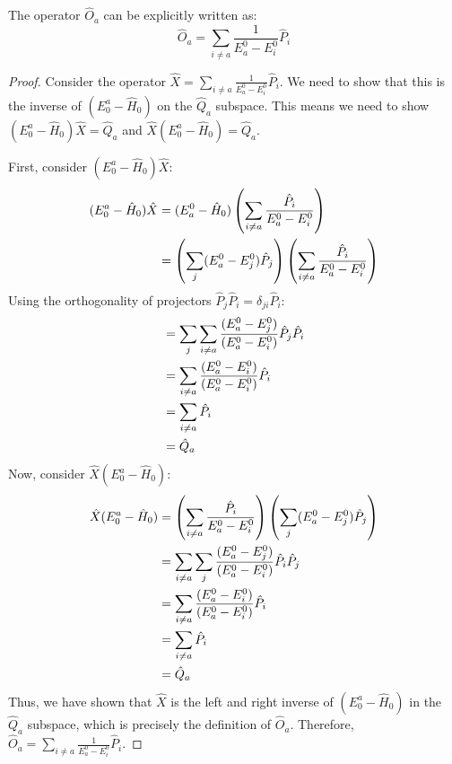 \begin{lemma}
    The operator $\hat O_a$ can be explicitly written as:
    \begin{equation} \label{eq:kato_operator_O_a_sum_form}
        \hat O_a = \sum_{i \ne a}\frac{1}{E_a^0 - E_i^0} \hat P_i
    \end{equation}
\end{lemma}
\begin{proof}
    Consider the operator $\hat X = \sum_{i \ne a}\frac{1}{E_a^0 -
    E_i^0} \hat P_i$. We need to show that this is the inverse of
    $(E^a_0 - \hat H_0)$ on the $\hat Q_a$ subspace. This means we
    need to show $(E^a_0 - \hat H_0) \hat X = \hat Q_a$ and $\hat X
    (E^a_0 - \hat H_0) = \hat Q_a$.

    First, consider $(E^a_0 - \hat H_0) \hat X$:
    \begin{align} \label{eq:O_a_inverse_proof1}
        (E^a_0 - \hat H_0) \hat X &= (E_a^0 - \hat H_0) \left(
        \sum_{i \ne a} \frac{\hat P_i}{E_a^0 - E_i^0} \right) \\
        &= \left( \sum_{j} (E_a^0 - E_j^0) \hat P_j \right) \left(
        \sum_{i \ne a} \frac{\hat P_i}{E_a^0 - E_i^0} \right) \notag
    \end{align}
    Using the orthogonality of projectors $\hat P_j \hat P_i =
    \delta_{ji} \hat P_i$:
    \begin{align}
        &= \sum_{j} \sum_{i \ne a} \frac{(E_a^0 - E_j^0)}{(E_a^0 -
        E_i^0)} \hat P_j \hat P_i \notag \\
        &= \sum_{i \ne a} \frac{(E_a^0 - E_i^0)}{(E_a^0 - E_i^0)}
        \hat P_i \notag \\
        &= \sum_{i \ne a} \hat P_i \notag \\
        &= \hat Q_a \notag
    \end{align}
    Now, consider $\hat X (E^a_0 - \hat H_0)$:
    \begin{align} \label{eq:O_a_inverse_proof2}
        \hat X (E^a_0 - \hat H_0) &=  \left( \sum_{i \ne a}
        \frac{\hat P_i}{E_a^0 - E_i^0} \right) \left( \sum_{j} (E_a^0
        - E_j^0) \hat P_j \right) \\
        &= \sum_{i \ne a} \sum_{j} \frac{(E_a^0 - E_j^0)}{(E_a^0 -
        E_i^0)} \hat P_i \hat P_j \notag \\
        &= \sum_{i \ne a} \frac{(E_a^0 - E_i^0)}{(E_a^0 - E_i^0)}
        \hat P_i \notag \\
        &= \sum_{i \ne a} \hat P_i \notag \\
        &= \hat Q_a \notag
    \end{align}
    Thus, we have shown that $\hat X$ is the left and right inverse
    of $(E^a_0 - \hat H_0)$ in the $\hat Q_a$ subspace, which is
    precisely the definition of $\hat O_a$. Therefore, $\hat O_a =
    \sum_{i \ne a}\frac{1}{E_a^0 - E_i^0} \hat P_i$.
\end{proof}

